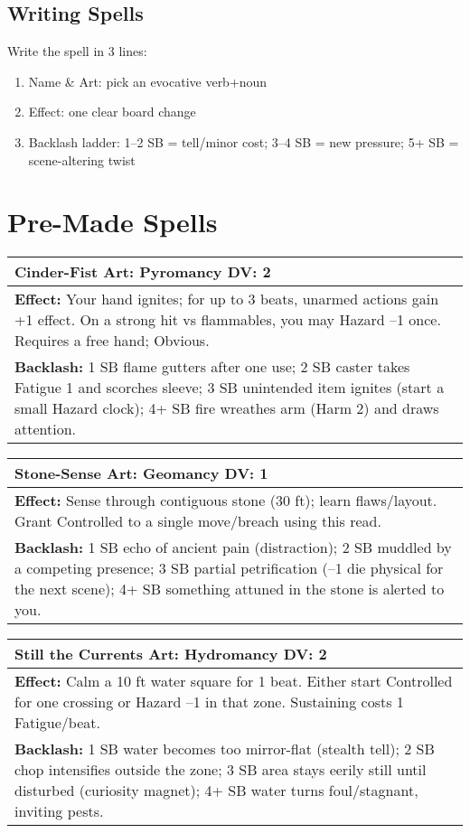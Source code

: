 \documentclass[11pt]{report}
\newenvironment{spellentry}[3]{%
  \begin{center}
    \begin{tabular}{|p{5.5in}|}
      \hline
      \textbf{#1} \hfill \textbf{Art:} #2 \hfill \textbf{DV:} #3 \\
      \hline
}{%
      \hline
    \end{tabular}
  \end{center}
}
\begin{document}
\subsection{Writing Spells}
Write the spell in 3 lines:
\begin{enumerate}
    \item Name \& Art: pick an evocative verb+noun
    \item Effect: one clear board change
    \item Backlash ladder: 1–2 SB = tell/minor cost; 3–4 SB = new pressure; 5+ SB = scene-altering twist
\end{enumerate}

\section{Pre-Made Spells}

\begin{spellentry}{Cinder-Fist}{Pyromancy}{2}
\textbf{Effect:} Your hand ignites; for up to 3 beats, unarmed actions gain +1 effect. On a strong hit vs flammables, you may Hazard –1 once. Requires a free hand; Obvious.\\
\textbf{Backlash:} 1 SB flame gutters after one use; 2 SB caster takes Fatigue 1 and scorches sleeve; 3 SB unintended item ignites (start a small Hazard clock); 4+ SB fire wreathes arm (Harm 2) and draws attention.
\end{spellentry}

\begin{spellentry}{Stone-Sense}{Geomancy}{1}
\textbf{Effect:} Sense through contiguous stone (30 ft); learn flaws/layout. Grant Controlled to a single move/breach using this read.\\
\textbf{Backlash:} 1 SB echo of ancient pain (distraction); 2 SB muddled by a competing presence; 3 SB partial petrification (–1 die physical for the next scene); 4+ SB something attuned in the stone is alerted to you.
\end{spellentry}

\begin{spellentry}{Still the Currents}{Hydromancy}{2}
\textbf{Effect:} Calm a 10 ft water square for 1 beat. Either start Controlled for one crossing or Hazard –1 in that zone. Sustaining costs 1 Fatigue/beat.\\
\textbf{Backlash:} 1 SB water becomes too mirror-flat (stealth tell); 2 SB chop intensifies outside the zone; 3 SB area stays eerily still until disturbed (curiosity magnet); 4+ SB water turns foul/stagnant, inviting pests.
\end{spellentry}
\end{document}

